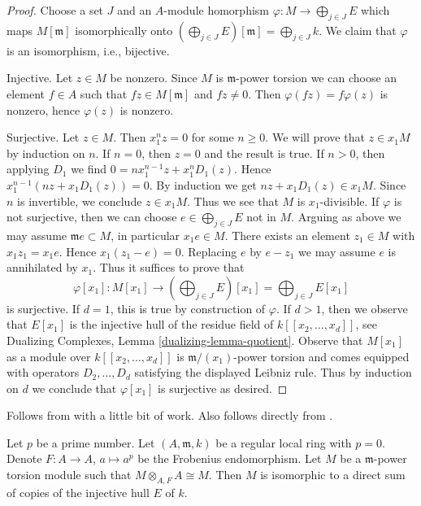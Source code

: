 \begin{proof}
Choose a set $J$ and an $A$-module homorphism
$\varphi : M \to \bigoplus_{j \in J} E$ which maps
$M[\mathfrak m]$ isomorphically onto
$(\bigoplus_{j \in J} E)[\mathfrak m] = \bigoplus_{j \in J} k$.
We claim that $\varphi$ is an isomorphism, i.e., bijective.

\medskip\noindent
Injective. Let $z \in M$ be nonzero. Since $M$ is $\mathfrak m$-power torsion
we can choose an element $f \in A$ such that $fz \in M[\mathfrak m]$ and
$fz \not = 0$. Then $\varphi(fz) = f\varphi(z)$ is nonzero, hence
$\varphi(z)$ is nonzero.

\medskip\noindent
Surjective. Let $z \in M$. Then $x_1^n z = 0$ for some $n \geq 0$.
We will prove that $z \in x_1M$ by induction on $n$.
If $n = 0$, then $z = 0$ and the result is true.
If $n > 0$, then applying $D_1$ we find $0 = n x_1^{n - 1} z + x_1^nD_1(z)$.
Hence $x_1^{n - 1}(nz + x_1D_1(z)) = 0$. By induction we get
$nz + x_1D_1(z) \in x_1M$. Since $n$ is invertible, we conclude
$z \in x_1M$. Thus we see that $M$ is $x_1$-divisible.
If $\varphi$ is not surjective, then we can choose
$e \in \bigoplus_{j \in J} E$ not in $M$.
Arguing as above we may assume $\mathfrak m e \subset M$,
in particular $x_1 e \in M$. There exists an element
$z_1 \in M$ with $x_1 z_1 = x_1 e$. Hence
$x_1(z_1 - e) = 0$. Replacing $e$ by $e - z_1$
we may assume $e$ is annihilated by $x_1$.
Thus it suffices to prove that
$$
\varphi[x_1] :
M[x_1]
\longrightarrow
\left(\bigoplus\nolimits_{j \in J} E\right)[x_1] =
\bigoplus\nolimits_{j \in J} E[x_1]
$$
is surjective. If $d = 1$, this is true by construction of $\varphi$.
If $d > 1$, then we observe that $E[x_1]$ is the injective hull
of the residue field of $k[[x_2, \ldots, x_d]]$, see
Dualizing Complexes, Lemma \ref{dualizing-lemma-quotient}.
Observe that $M[x_1]$ as a module over $k[[x_2, \ldots, x_d]]$
is $\mathfrak m/(x_1)$-power torsion and comes
equipped with operators $D_2, \ldots, D_d$ satisfying
the displayed Leibniz rule.
Thus by induction on $d$ we conclude that $\varphi[x_1]$
is surjective as desired.
\end{proof}

\begin{lemma}
\label{lemma-structure-torsion-Frobenius-regular}
\begin{reference}
Follows from \cite[Corollary 3.6]{Huneke-Sharp} with a
little bit of work. Also follows directly from
\cite[Theorem 1.4]{Lyubeznik2}.
\end{reference}
Let $p$ be a prime number. Let $(A, \mathfrak m, k)$
be a regular local ring with $p = 0$. Denote $F : A \to A$, $a \mapsto a^p$
be the Frobenius endomorphism. Let $M$ be a $\mathfrak m$-power torsion module
such that $M \otimes_{A, F} A \cong M$. Then $M$ is isomorphic to a direct sum
of copies of the injective hull $E$ of $k$.
\end{lemma}

